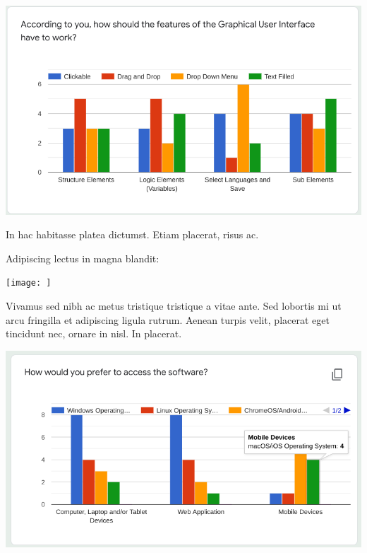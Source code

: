 \documentclass[a0,portrait]{a0poster}
\begin{document}
\begin{multicols}{2}
\begin{center}\vspace{1cm}
\includegraphics[width=0.8\linewidth]{../../Showcase-Work_Completed/Surveying/q11.png}
\label{fig:q-11}
\end{center}\vspace{1cm}

In hac habitasse platea dictumst. Etiam placerat, risus ac.

Adipiscing lectus in magna blandit:

\begin{center}\vspace{1cm}
    \texttt{[image: ]}
    \label{fig:fuzzyLogicPerformance}
\end{center}\vspace{1cm}

Vivamus sed nibh ac metus tristique tristique a vitae ante. Sed lobortis mi ut arcu fringilla et adipiscing ligula rutrum. Aenean turpis velit, placerat eget tincidunt nec, ornare in nisl. In placerat.

\begin{center}\vspace{1cm}
\includegraphics[width=0.8\linewidth]{../../Showcase-Work_Completed/Surveying/q12.png}
\label{fig:q-12}
\end{center}\vspace{1cm}


\end{multicols}
\end{document}
